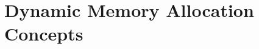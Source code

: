 \clearpage
\section{Dynamic Memory Allocation Concepts} %
\label{sec:dynamic_memory_allocation_concepts}









